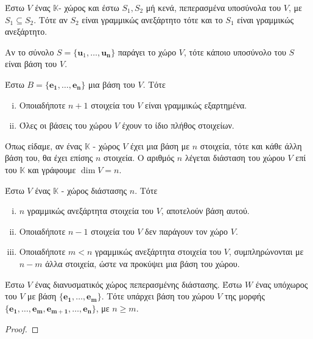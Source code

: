 \begin{cor}
    Έστω $V$ ένας $ \mathbb{K} $- χώρος και έστω $ S_{1}, S_{2} $ μή κενά, 
    πεπερασμένα υποσύνολα του $V$, με $ S_{1} \subseteq S_{2} $. Τότε αν 
    $ S_{2} $ είναι γραμμικώς ανεξάρτητο τότε και το $ S_{1} $ είναι γραμμικώς 
    ανεξάρτητο.
\end{cor}

\begin{prop}
    Αν το σύνολο $ S = \{ \mathbf{u}_{1}, \ldots, \mathbf{u_{n}} \} $ παράγει 
    το χώρο $V$, τότε κάποιο υποσύνολο του $S$ είναι βάση του $V$.
\end{prop}

\begin{thm}
    Έστω $ B = \{ \mathbf{e_{1}}, \ldots, \mathbf{e_{n}} \} $ μια βάση του $V$. 
    Τότε 
    \begin{enumerate}[i)]
        \item Οποιαδήποτε $ n+1 $ στοιχεία του $V$ είναι γραμμικώς εξαρτημένα.
        \item Όλες οι βάσεις του χώρου $V$ έχουν το ίδιο πλήθος στοιχείων.
    \end{enumerate}
\end{thm}

\begin{dfn}
    Όπως είδαμε, αν ένας $ \mathbb{K} $ - χώρος $V$ έχει μια βάση με 
    $ n $ στοιχεία, τότε και κάθε άλλη βάση του, θα έχει επίσης $n$ στοιχεία. 
    Ο αριθμός $n$ λέγεται \textcolor{Col2}{διάσταση} του χώρου $V$ επί του 
    $ \mathbb{K} $ και γράφουμε $ \dim V = n $.
\end{dfn}

\begin{prop}
\item {}
    Έστω $V$ ένας $ \mathbb{K} $ - χώρος διάστασης $n$. Τότε
    \begin{enumerate}[i)]
        \item $n$ γραμμικώς ανεξάρτητα στοιχεία του $V$, αποτελούν βάση αυτού.
        \item Οποιαδήποτε $ n-1 $ στοιχεία του $V$ δεν παράγουν τον χώρο $V$.
        \item Οποιαδήποτε $ m < n $ γραμμικώς ανεξάρτητα στοιχεία του $V$, 
            συμπληρώνονται με $ n-m $ άλλα στοιχεία, ώστε να προκύψει μια 
            βάση του χώρου.
    \end{enumerate}
\end{prop}

\begin{prop}
    Έστω $V$ ένας διανυσματικός χώρος πεπερασμένης διάστασης. Έστω $ W $ ένας 
    υπόχωρος του $V$ με βάση $ \{ \mathbf{e_{1}}, \ldots, \mathbf{e_{m}} \} $. 
    Τότε υπάρχει βάση του χώρου $ V $ της μορφής 
    $ \{ \mathbf{e_{1}}, \ldots, \mathbf{e_{m}}, \mathbf{e_{m+1}}, \ldots, 
    \mathbf{e_{n}} \} $, με $ n \geq m $.
\end{prop}
\begin{proof}

\end{proof}

